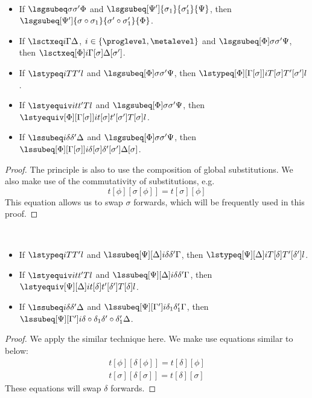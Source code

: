 \begin{lemma} $ $
  \begin{itemize}
  \item If $\lsgsubeq \sigma{\sigma'} \Phi$ and $\lsgsubeq[\Psi']{\sigma_1}{\sigma_1'}{\Psi}$, then
    $\lsgsubeq[\Psi']{\sigma \circ \sigma_1}{\sigma' \circ \sigma_1'}{\Phi}$.
  \item If $\lsctxeq i \Gamma\Delta$, $i \in \{\proglevel, \metalevel\}$ and $\lsgsubeq[\Phi] \sigma{\sigma'} \Psi$, then
    $\lsctxeq[\Phi] i{\Gamma[\sigma]}{\Delta[\sigma']}$.
  \item If $\lstypeq i T{T'} l$ and $\lsgsubeq[\Phi] \sigma{\sigma'} \Psi$, then
    $\lstypeq[\Phi][\Gamma[\sigma]] i{T[\sigma]}{T'[\sigma']}{l}$.
  \item If $\lstyequiv i t{t'} T l$ and $\lsgsubeq[\Phi] \sigma{\sigma'} \Psi$,
    then
    $\lstyequiv[\Phi][\Gamma[\sigma]] i{t[\sigma]}{t'[\sigma']}{T[\sigma]}{l}$.
  \item If $\lssubeq i \delta{\delta'}{\Delta}$ and $\lsgsubeq[\Phi] \sigma{\sigma'} \Psi$, then
    $\lssubeq[\Phi][\Gamma[\sigma]] i{\delta[\sigma]}{\delta'[\sigma']}{\Delta[\sigma]}$.
  \end{itemize}  
\end{lemma}
\begin{proof}
  The principle is also to use the composition of global substitutions. %
  We also make use of the commutativity of substitutions, e.g.
  \[
    t[\phi][\sigma[\phi]] = t[\sigma][\phi]
  \]
  This equation allows us to swap $\sigma$ forwards, which will be frequently used in
  this proof.
\end{proof}

\begin{lemma} $ $
  \begin{itemize}
  \item If $\lstypeq i T{T'} l$ and $\lssubeq[\Psi][\Delta] i \delta{\delta'}{\Gamma}$, then
    $\lstypeq[\Psi][\Delta] i{T[\delta]}{T'[\delta']}{l}$.
  \item If $\lstyequiv i t{t'} T l$ and
    $\lssubeq[\Psi][\Delta] i \delta{\delta'}{\Gamma}$, then
    $\lstyequiv[\Psi][\Delta] i{t[\delta]}{t'[\delta']}{T[\delta]}{l}$.
  \item If $\lssubeq i \delta{\delta'}{\Delta}$ and $\lssubeq[\Psi][\Gamma'] i{\delta_1}{\delta_1'}{\Gamma}$, then
    $\lssubeq[\Psi][\Gamma'] i{\delta \circ \delta_1}{\delta' \circ \delta_1'}{\Delta}$.
  \end{itemize}  
\end{lemma}
\begin{proof}
  We apply the similar technique here. %
  We make use equations similar to below:
  \begin{gather*}
    t[\phi][\delta[\phi]] = t[\delta][\phi] \\
    t[\sigma][\delta[\sigma]] = t[\delta][\sigma]
  \end{gather*}
  These equations will swap $\delta$ forwards. 
\end{proof}

